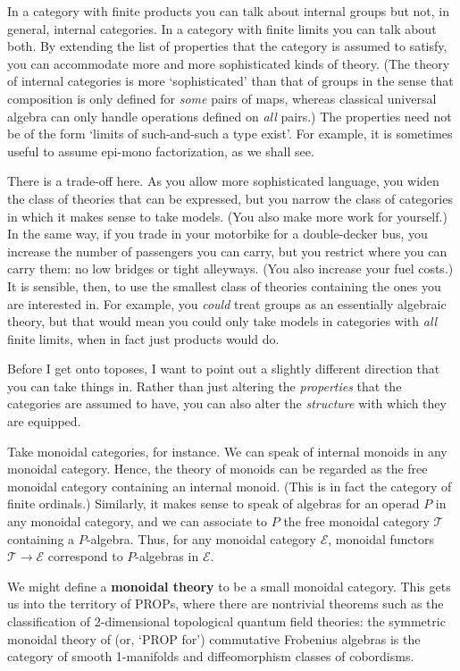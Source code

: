 \documentclass{article}
\newcommand{\cat}[1]{\mathscr{#1}}
\newcommand{\demph}[1]{\textbf{\textup{#1}}}
\newcommand{\E}{\cat{E}}
\newcommand{\T}{\cat{T}}
\begin{document}
In a category with finite products you can talk about internal groups but not,
in general, internal categories.  In a category with finite limits you can
talk about both.  By extending the list of properties that the category is
assumed to satisfy, you can accommodate more and more sophisticated kinds of
theory.  (The theory of internal categories is more `sophisticated' than that
of groups in the sense that composition is only defined for \emph{some} pairs
of maps, whereas classical universal algebra can only handle operations
defined on \emph{all} pairs.)  The properties need not be of the form `limits
of such-and-such a type exist'.  For example, it is sometimes useful to assume
epi-mono factorization, as we shall see.

There is a trade-off here.  As you allow more sophisticated language, you
widen the class of theories that can be expressed, but you narrow the class of
categories in which it makes sense to take models.  (You also make more work
for yourself.)  In the same way, if you trade in your motorbike for a
double-decker bus, you increase the number of passengers you can carry, but
you restrict where you can carry them: no low bridges or tight alleyways.
(You also increase your fuel costs.)  It is sensible, then, to use
the smallest class of theories containing the ones you are interested in.
For example, you \emph{could} treat groups as an essentially algebraic theory,
but that would mean you could only take models in categories with \emph{all}
finite limits, when in fact just products would do.

Before I get onto toposes, I want to point out a slightly different direction
that you can take things in.  Rather than just altering the \emph{properties}
that the categories are assumed to have, you can also alter the
\emph{structure} with which they are equipped. 

Take monoidal categories, for instance.  We can speak of internal monoids in
any monoidal category.  Hence, the theory of monoids can be regarded as the
free monoidal category containing an internal monoid.  (This is in fact the
category of finite ordinals.)  Similarly, it makes sense to speak of algebras
for an operad $P$ in any monoidal category, and we can associate to $P$ the
free monoidal category $\T$ containing a $P$-algebra.  Thus, for any monoidal
category $\E$, monoidal functors $\T \to \E$ correspond to $P$-algebras in
$\E$.

We might define a \demph{monoidal theory} to be a small monoidal category.
This gets us into the territory of PROPs, where there are nontrivial theorems
such as the classification of 2-dimensional topological quantum field
theories: the symmetric monoidal theory of (or, `PROP for') commutative
Frobenius algebras is the category of smooth 1-manifolds and diffeomorphism
classes of cobordisms.
\end{document}
